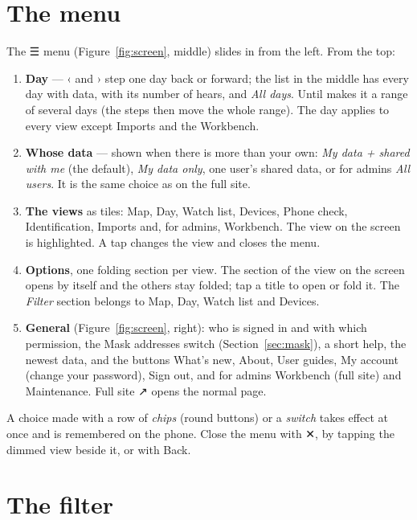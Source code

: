 \documentclass[10pt,a4paper]{article}
\newcommand{\ui}[1]{\textsf{\small #1}}            %
\begin{document}
\section{The menu}\label{sec:menu}

The \ui{☰} menu (Figure~\ref{fig:screen}, middle) slides in from the left. From the top:
\begin{enumerate}[leftmargin=1.4em]
\item \textbf{Day} --- \ui{‹} and \ui{›} step one day back or forward; the list in the middle has every day with data, with its number of hears, and \emph{All days}. \ui{Until} makes it a range of several days (the steps then move the whole range). The day applies to every view except Imports and the Workbench.
\item \textbf{Whose data} --- shown when there is more than your own: \emph{My data + shared with me} (the default), \emph{My data only}, one user's shared data, or for admins \emph{All users}. It is the same choice as on the full site.
\item \textbf{The views} as tiles: Map, Day, Watch list, Devices, Phone check, Identification, Imports and, for admins, Workbench. The view on the screen is highlighted. A tap changes the view and closes the menu.
\item \textbf{Options}, one folding section per view. The section of the view on the screen opens by itself and the others stay folded; tap a title to open or fold it. The \emph{Filter} section belongs to Map, Day, Watch list and Devices.
\item \textbf{General} (Figure~\ref{fig:screen}, right): who is signed in and with which permission, the \ui{Mask addresses} switch (Section~\ref{sec:mask}), a short help, the newest data, and the buttons \ui{What's new}, \ui{About}, \ui{User guides}, \ui{My account} (change your password), \ui{Sign out}, and for admins \ui{Workbench (full site)} and \ui{Maintenance}. \ui{Full site ↗} opens the normal page.
\end{enumerate}
A choice made with a row of \emph{chips} (round buttons) or a \emph{switch} takes effect at once and is remembered on the phone. Close the menu with \ui{✕}, by tapping the dimmed view beside it, or with Back.

\section{The filter}\label{sec:filter}
\end{document}
